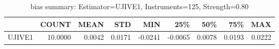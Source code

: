 \begin{table}[ht]
\centering
\caption{bias summary: Estimator=UJIVE1, Instruments=125, Strength=0.80}
\begin{tabular}{lrrrrrrrr}
\toprule
 & COUNT & MEAN & STD & MIN & 25\% & 50\% & 75\% & MAX \\
\midrule
UJIVE1 & 10.0000 & 0.0042 & 0.0171 & -0.0241 & -0.0065 & 0.0078 & 0.0193 & 0.0222 \\
\bottomrule
\end{tabular}
\end{table}
